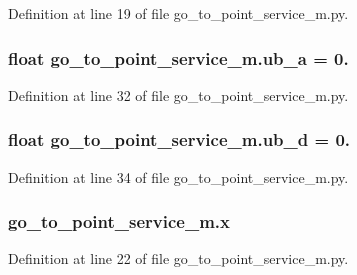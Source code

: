 Definition at line 19 of file go\+\_\+to\+\_\+point\+\_\+service\+\_\+m.\+py.

\subsubsection[{\texorpdfstring{ub\+\_\+a}{ub_a}}]{\setlength{\rightskip}{0pt plus 5cm}float go\+\_\+to\+\_\+point\+\_\+service\+\_\+m.\+ub\+\_\+a = 0.}\hypertarget{namespacego__to__point__service__m_ac8de1564925338ead12be0a3763b4119}{}\label{namespacego__to__point__service__m_ac8de1564925338ead12be0a3763b4119}


Definition at line 32 of file go\+\_\+to\+\_\+point\+\_\+service\+\_\+m.\+py.

\subsubsection[{\texorpdfstring{ub\+\_\+d}{ub_d}}]{\setlength{\rightskip}{0pt plus 5cm}float go\+\_\+to\+\_\+point\+\_\+service\+\_\+m.\+ub\+\_\+d = 0.}\hypertarget{namespacego__to__point__service__m_aba661cc0f865736231acaf5b56101b35}{}\label{namespacego__to__point__service__m_aba661cc0f865736231acaf5b56101b35}


Definition at line 34 of file go\+\_\+to\+\_\+point\+\_\+service\+\_\+m.\+py.

\subsubsection[{\texorpdfstring{x}{x}}]{\setlength{\rightskip}{0pt plus 5cm}go\+\_\+to\+\_\+point\+\_\+service\+\_\+m.\+x}\hypertarget{namespacego__to__point__service__m_a3ec6e272b02c0f40a625358965caf70b}{}\label{namespacego__to__point__service__m_a3ec6e272b02c0f40a625358965caf70b}


Definition at line 22 of file go\+\_\+to\+\_\+point\+\_\+service\+\_\+m.\+py.


